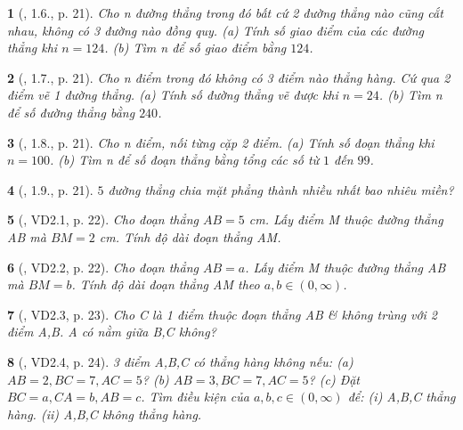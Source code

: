 \documentclass{article}
\newtheorem{baitoan}{}
\begin{document}
\begin{baitoan}[\cite{TLCT_THCS_Toan_6_hinh_hoc}, 1.6., p. 21]
	Cho n đường thẳng trong đó bất cứ 2 đường thẳng nào cũng cắt nhau, không có 3 đường nào đồng quy. (a) Tính số giao điểm của các đường thẳng khi $n = 124$. (b) Tìm n để số giao điểm bằng $124$.
\end{baitoan}

\begin{baitoan}[\cite{TLCT_THCS_Toan_6_hinh_hoc}, 1.7., p. 21]
	Cho n điểm trong đó không có 3 điểm nào thẳng hàng. Cứ qua 2 điểm vẽ 1 đường thẳng. (a) Tính số đường thẳng vẽ được khi $n = 24$. (b) Tìm n để số đường thẳng bằng $240$.
\end{baitoan}

\begin{baitoan}[\cite{TLCT_THCS_Toan_6_hinh_hoc}, 1.8., p. 21]
	Cho n điểm, nối từng cặp 2 điểm. (a) Tính số đoạn thẳng khi $n = 100$. (b) Tìm n để số đoạn thẳng bằng tổng các số từ $1$ đến $99$.
\end{baitoan}

\begin{baitoan}[\cite{TLCT_THCS_Toan_6_hinh_hoc}, 1.9., p. 21]
	$5$ đường thẳng chia mặt phẳng thành nhiều nhất bao nhiêu miền?
\end{baitoan}

\begin{baitoan}[\cite{TLCT_THCS_Toan_6_hinh_hoc}, VD2.1, p. 22]
	Cho đoạn thẳng $AB = 5$ {\rm cm}. Lấy điểm M thuộc đường thẳng AB mà $BM = 2$ {\rm cm}. Tính độ dài đoạn thẳng AM.
\end{baitoan}

\begin{baitoan}[\cite{TLCT_THCS_Toan_6_hinh_hoc}, VD2.2, p. 22]
	Cho đoạn thẳng $AB = a$. Lấy điểm M thuộc đường thẳng AB mà $BM = b$. Tính độ dài đoạn thẳng AM theo $a,b\in(0,\infty)$.
\end{baitoan}

\begin{baitoan}[\cite{TLCT_THCS_Toan_6_hinh_hoc}, VD2.3, p. 23]
	Cho C là 1 điểm thuộc đoạn thẳng AB \& không trùng với 2 điểm A,B. A có nằm giữa B,C không?
\end{baitoan}

\begin{baitoan}[\cite{TLCT_THCS_Toan_6_hinh_hoc}, VD2.4, p. 24]
	3 điểm A,B,C có thẳng hàng không nếu: (a) $AB = 2,BC = 7,AC = 5$? (b) $AB = 3,BC = 7,AC = 5$? (c) Đặt $BC = a,CA = b,AB = c$. Tìm điều kiện của $a,b,c\in(0,\infty)$ để: (i) A,B,C thẳng hàng. (ii) A,B,C không thẳng hàng.
\end{baitoan}
\end{document}
